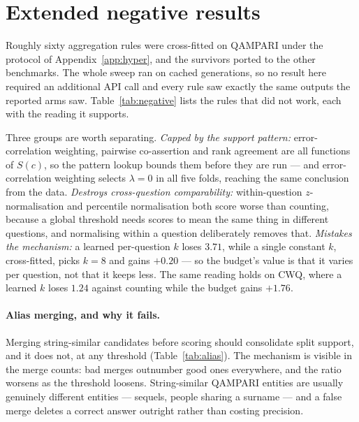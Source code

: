 \documentclass{article}
\begin{document}
\section{Extended negative results}
\label{app:negative}

Roughly sixty aggregation rules were cross-fitted on QAMPARI under the protocol of Appendix~\ref{app:hyper}, and the survivors ported to the other benchmarks. The whole sweep ran on cached generations, so no result here required an additional API call and every rule saw exactly the same outputs the reported arms saw. Table~\ref{tab:negative} lists the rules that did not work, each with the reading it supports.

Three groups are worth separating. \emph{Capped by the support pattern:} error-correlation weighting, pairwise co-assertion and rank agreement are all functions of $S(c)$, so the pattern lookup bounds them before they are run --- and error-correlation weighting selects $\lambda = 0$ in all five folds, reaching the same conclusion from the data. \emph{Destroys cross-question comparability:} within-question $z$-normalisation and percentile normalisation both score worse than counting, because a global threshold needs scores to mean the same thing in different questions, and normalising within a question deliberately removes that. \emph{Mistakes the mechanism:} a learned per-question $k$ loses $3.71$, while a single constant $k$, cross-fitted, picks $k=8$ and gains $+0.20$ --- so the budget's value is that it varies per question, not that it keeps less. The same reading holds on CWQ, where a learned $k$ loses $1.24$ against counting while the budget gains $+1.76$.

\paragraph{Alias merging, and why it fails.}
Merging string-similar candidates before scoring should consolidate split support, and it does not, at any threshold (Table~\ref{tab:alias}). The mechanism is visible in the merge counts: bad merges outnumber good ones everywhere, and the ratio worsens as the threshold loosens. String-similar QAMPARI entities are usually genuinely different entities --- sequels, people sharing a surname --- and a false merge deletes a correct answer outright rather than costing precision.
\end{document}
